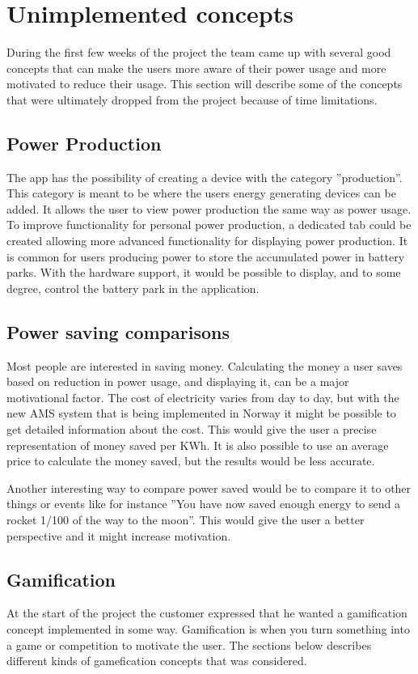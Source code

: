 \section{Unimplemented concepts}
During the first few weeks of the project the team came up with several good concepts that can make the users more aware of their power usage and more motivated to reduce their usage. This section will describe some of the concepts that were ultimately dropped from the project because of time limitations.

\subsection{Power Production}
The app has the possibility of creating a device with the category ''production''. This category is meant to be where the users energy generating devices can be added. It allows the user to view power production the same way as power usage. To improve functionality for personal power production, a dedicated tab could be created allowing more advanced functionality for displaying power production.
It is common for users producing power to store the accumulated power in battery parks. With the hardware support, it would be possible to display, and to some degree, control the battery park in the application.

\subsection{Power saving comparisons}
\label{sec:psc}
Most people are interested in saving money. Calculating the money a user saves based on reduction in power usage, and displaying it, can be a major motivational factor. The cost of electricity varies from day to day, but with the new AMS\cite{ams} system that is being implemented in Norway it might be possible to get detailed information about the cost. This would give the user a precise representation of money saved per KWh. It is also possible to use an average price to calculate the money saved, but the results would be less accurate.

Another interesting way to compare power saved would be to compare it to other things or events like for instance ''You have now saved enough energy to send a rocket 1/100 of the way to the moon''. This would give the user a better perspective and it might increase motivation.

\subsection{Gamification}
At the start of the project the customer expressed that he wanted a gamification concept implemented in some way. Gamification is when you turn something into a game or competition to motivate the user. The sections below describes different kinds of gamefication concepts that was considered.

